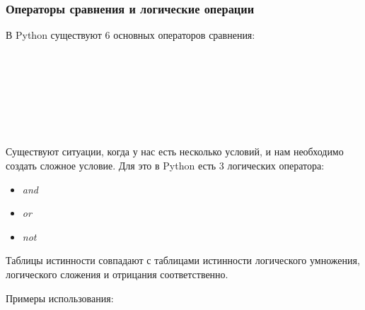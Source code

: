 \subsubsection{Операторы сравнения и логические операции}

В Python существуют 6 основных операторов сравнения:

\begin{flushleft}
	 \\
	 \\
	 \\
	 \\
	 \\
	 \\
\end{flushleft}

Существуют ситуации, когда у нас есть несколько условий, и нам необходимо создать сложное условие. Для это в Python есть 3 логических оператора:

\begin{itemize}
	\setlength\itemsep{0.1em}
	\item \textit{and}
	\item \textit{or}
	\item \textit{not}
\end{itemize}

Таблицы истинности совпадают с таблицами истинности логического умножения, логического сложения и отрицания соответственно.

Примеры использования:

\begin{flushleft}
	 \\
	 \\
	 \\
	 \\
	 \\
	\vspace{1cm}
	 \\
	 \\
	 \\
	
\end{flushleft}


